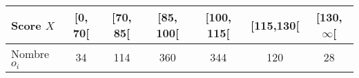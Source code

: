 \documentclass{standalone}
\begin{document}
\begin{tabular}{l|c|c|c|c|c|c}
	Score $X$ & [0, 70[ & [70, 85[ & [85, 100[ & [100, 115[ & [115,130[ & [130, $\infty$[\\
	\hline 
	Nombre $o_i$ & 34 & 114 & 360 &344 & 120 & 28
\end{tabular}
\end{document}
